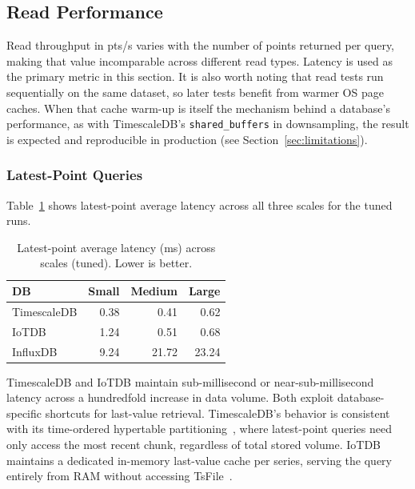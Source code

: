 \subsection{Read Performance}
\label{sec:read-results}

Read throughput in pts/s varies with the number of points returned per query, making
that value incomparable across different read types. Latency is used as the primary
metric in this section. It is also worth noting that read tests run sequentially
on the same dataset, so later tests benefit from warmer OS page caches. When that
cache warm-up is itself the mechanism behind a database's performance, as with
TimescaleDB's \texttt{shared\_buffers} in downsampling, the result is expected and
reproducible in production (see Section~\ref{sec:limitations}).

\subsubsection{Latest-Point Queries}

Table~\ref{tab:latest} shows latest-point average latency across all three scales for the
tuned runs.

\begin{table}[ht]
  \centering
  \caption{Latest-point average latency (ms) across scales (tuned). Lower is better.}
  \label{tab:latest}
  \begin{tabular}{lrrr}
    \hline
    \textbf{DB} & \textbf{Small} & \textbf{Medium} & \textbf{Large} \\
    \hline
    TimescaleDB &  0.38 &  0.41 &  0.62 \\
    IoTDB       &  1.24 &  0.51 &  0.68 \\
    InfluxDB    &  9.24 & 21.72 & 23.24 \\
    \hline
  \end{tabular}
\end{table}

TimescaleDB and IoTDB maintain sub-millisecond or near-sub-millisecond latency across
a hundredfold increase in data volume. Both exploit database-specific shortcuts for last-value retrieval.
TimescaleDB's behavior is consistent with its time-ordered hypertable partitioning~\citep{timescaledb},
where latest-point queries need only access the most recent chunk,
regardless of total stored volume. IoTDB maintains a dedicated in-memory last-value cache per series, serving
the query entirely from RAM without accessing TsFile~\citep{iotdblastquery}.

